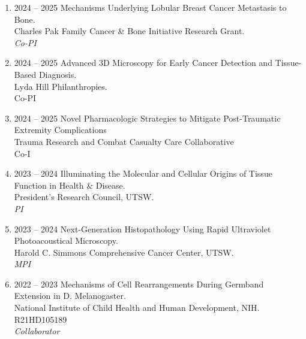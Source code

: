 \begin{enumerate}
[leftmargin=!,
labelindent=0pt,
itemindent=-66pt,
label=\textbullet]


\item 2024 -- 2025 
\hspace{8pt}
Mechanisms Underlying Lobular Breast Cancer Metastasis to Bone. \\
Charles Pak Family Cancer \& Bone Initiative Research Grant. \\
{\it Co-PI}

\item 2024 -- 2025 
\hspace{8pt}
Advanced 3D Microscopy for Early Cancer Detection and Tissue-Based Diagnosis. \\
Lyda Hill Philanthropies. \\
Co-PI \\ 

\item 2024 -- 2025 
\hspace{8pt}
Novel Pharmacologic Strategies to Mitigate Post-Traumatic Extremity Complications \\
Trauma Research and Combat Casualty Care Collaborative \\
Co-I \\ 

\item 2023 -- 2024 
\hspace{8pt}
Illuminating the Molecular and Cellular Origins of Tissue Function in Health \& Disease.\\
President’s Research Council, UTSW.\\
{\it PI}

\item 2023 -- 2024 
\hspace{8pt}
Next-Generation Histopathology Using Rapid Ultraviolet Photoacoustical Microscopy. \\
Harold C. Simmons Comprehensive Cancer Center, UTSW. \\
{\it MPI}

\item 2022 -- 2023 
\hspace{8pt}
Mechanisms of Cell Rearrangements During Germband Extension in D. Melanogaster.\\
National Institute of Child Health and Human Development, NIH. \\
R21HD105189 \\
{\it Collaborator}


\end{enumerate}
